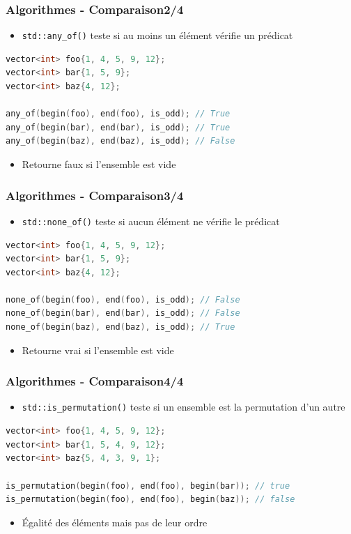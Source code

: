 \documentclass[C++.tex]{subfiles}
\begin{document}
\begin{frame}[fragile]
	\frametitle{Algorithmes - Comparaison\titlehfill{}2/4}
	\begin{itemize}
		\item \lstinline|std::any_of()| teste si au moins un élément vérifie un prédicat
	\end{itemize}

	\begin{lstlisting}[language=C++]
vector<int> foo{1, 4, 5, 9, 12};
vector<int> bar{1, 5, 9};
vector<int> baz{4, 12};

any_of(begin(foo), end(foo), is_odd); // True
any_of(begin(bar), end(bar), is_odd); // True
any_of(begin(baz), end(baz), is_odd); // False\end{lstlisting}

	\begin{itemize}
		\item Retourne faux si l'ensemble est vide
	\end{itemize}
\end{frame}

\begin{frame}[fragile]
	\frametitle{Algorithmes - Comparaison\titlehfill{}3/4}
	\begin{itemize}
		\item \lstinline|std::none_of()| teste si aucun élément ne vérifie le prédicat
	\end{itemize}

	\begin{lstlisting}[language=C++]
vector<int> foo{1, 4, 5, 9, 12};
vector<int> bar{1, 5, 9};
vector<int> baz{4, 12};

none_of(begin(foo), end(foo), is_odd); // False
none_of(begin(bar), end(bar), is_odd); // False
none_of(begin(baz), end(baz), is_odd); // True\end{lstlisting}

	\begin{itemize}
		\item Retourne vrai si l'ensemble est vide
	\end{itemize}
\end{frame}

\begin{frame}[fragile]
	\frametitle{Algorithmes - Comparaison\titlehfill{}4/4}
	\begin{itemize}
		\item \lstinline|std::is_permutation()| teste si un ensemble est la permutation d'un autre
	\end{itemize}

	\begin{lstlisting}[language=C++]
vector<int> foo{1, 4, 5, 9, 12};
vector<int> bar{1, 5, 4, 9, 12};
vector<int> baz{5, 4, 3, 9, 1};

is_permutation(begin(foo), end(foo), begin(bar)); // true
is_permutation(begin(foo), end(foo), begin(baz)); // false\end{lstlisting}

	\begin{itemize}
		\item Égalité des éléments mais pas de leur ordre
	\end{itemize}
\end{frame}
\end{document}
